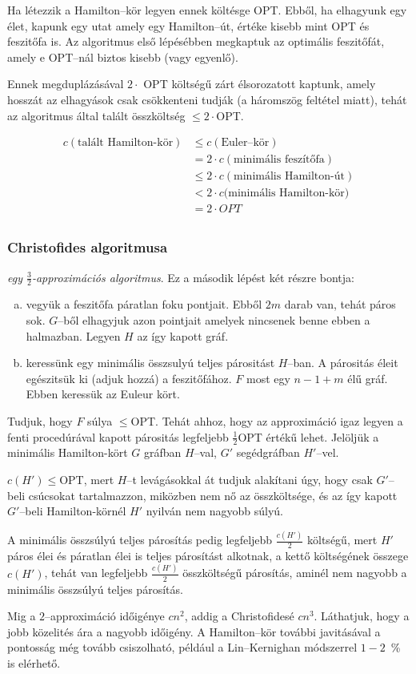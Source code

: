 Ha létezzik a Hamilton--kör legyen ennek költésge OPT. Ebből, ha elhagyunk egy
élet, kapunk egy utat amely egy Hamilton--út, értéke kisebb mint OPT és
feszitőfa is. Az algoritmus első lépésébben megkaptuk az optimális feszitőfát,
amely e OPT--nál biztos kisebb (vagy egyenlő).

Ennek megduplázásával $2 \cdot$ OPT költségű zárt élsorozatott kaptunk, amely
hosszát az elhagyások csak csökkenteni tudják (a háromszög feltétel miatt),
tehát az algoritmus által talált összköltség $\leq 2 \cdot$OPT.

\begin{align*}
 c(\mbox{talált Hamilton-kör}) &\leq c(\mbox{Euler--kör})		         \\ 
 						       &= 2  \cdot c(\mbox{minimális feszítőfa})       \\
 							   & \leq 2 \cdot c(\mbox{minimális Hamilton-út}) \\ 
 							   & < 2\cdot c(\mbox{minimális Hamilton-kör)}    \\ 
 							   & = 2\cdot OPT 								  \\
\end{align*}

\subsubsection{Christofides algoritmusa}

\emph{egy $\frac{3}{2}$-approximációs algoritmus}. Ez a második lépést két részre bontja:

\begin{enumerate}[(a)]
\item vegyük a feszitőfa páratlan foku pontjait. Ebből $2m$ darab van, tehát
páros sok. $G$--ből elhagyjuk azon pointjait amelyek nincsenek benne ebben a
halmazban. Legyen $H$ az így kapott gráf.
\item keressünk egy minimális összsulyú teljes párositást $H$--ban. A párositás
éleit egészitsük ki (adjuk hozzá) a feszitőfához. $F$ most egy $n-1+m$ élű gráf.
Ebben keressük az Euleur kört.
\end{enumerate}

Tudjuk, hogy $F$ súlya $\leq$OPT. Tehát ahhoz, hogy az approximáció igaz legyen
a fenti procedúrával kapott párositás legfeljebb $\frac{1}{2}$OPT értékű lehet.
Jelöljük a minimális Hamilton-kört $G$ gráfban $H$--val, $G'$ segédgráfban
$H'$--vel. 

$c(H') \leq$OPT, mert $H$--t levágásokkal át tudjuk alakítani úgy, hogy csak
$G'$--beli csúcsokat tartalmazzon, miközben nem nő az összköltsége, és az így
kapott $G'$--beli Hamilton-körnél $H'$ nyilván nem nagyobb súlyú.

A minimális összsúlyú teljes párosítás pedig legfeljebb $\frac{c(H')}{2}$
költségű, mert $H'$ páros élei és páratlan élei is teljes párosítást alkotnak, a
kettő költségének összege $c(H')$, tehát van legfeljebb $\frac{c(H')}{2}$
összköltségű párosítás, aminél nem nagyobb a minimális összsúlyú teljes
párosítás.

Mig a $2$--approximáció időigénye $cn^2$, addig a Christofidesé $cn^3$.
Láthatjuk, hogy a jobb közelités ára a nagyobb időigény. A Hamilton--kör
további javitásával a pontosság még tovább csiszolható, például a Lin--Kernighan
módszerrel $1-2$~\% is elérhető. 